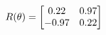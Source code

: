 \documentclass[preview]{standalone}
\begin{document}
\begin{align*}
\special{dvisvgm:raw <g id='unique000'>}R(\theta) = \begin{bmatrix}0.22 & 0.97\\-0.97 & 0.22\end{bmatrix}\special{dvisvgm:raw </g>}
\end{align*}
\end{document}

